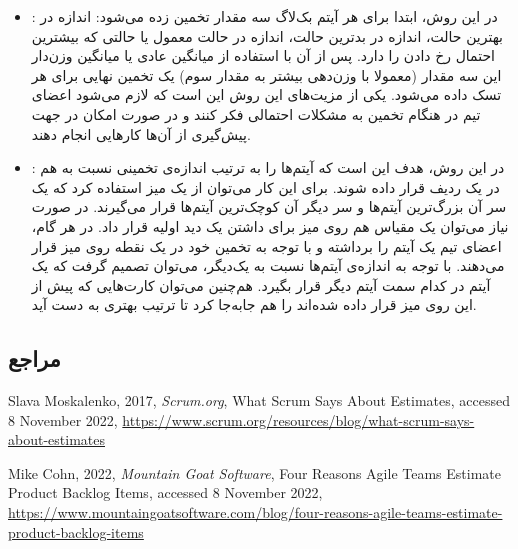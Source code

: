 {\begin{itemize}
\item
{}:
در این روش، ابتدا برای هر آیتم بک‌لاگ سه مقدار تخمین زده می‌شود: اندازه در بهترین‌ حالت، اندازه در بدترین حالت، اندازه در حالت معمول یا حالتی که بیشترین احتمال رخ دادن را دارد. پس از آن با استفاده از میانگین عادی یا میانگین وزن‌دار این سه مقدار (معمولا با وزن‌دهی بیشتر به مقدار سوم) یک تخمین نهایی برای هر تسک داده می‌شود. یکی از مزیت‌های این روش این است که لازم می‌شود اعضای تیم در هنگام تخمین به مشکلات احتمالی فکر کنند و در صورت امکان در جهت پیش‌گیری از آن‌ها کارهایی انجام دهند.

\item
{}:
در این روش، هدف این است که آیتم‌ها را به ترتیب اندازه‌ی تخمینی نسبت به هم در یک ردیف قرار داده شوند. برای این کار می‌توان از یک میز استفاده کرد که یک سر آن بزرگ‌ترین آیتم‌ها‌ و سر دیگر آن کوچک‌ترین آیتم‌ها قرار می‌گیرند. در صورت نیاز می‌توان یک مقیاس هم روی میز برای داشتن یک دید اولیه قرار داد. در هر گام، اعضای تیم یک آیتم را برداشته و با توجه به تخمین خود در یک نقطه روی میز قرار می‌دهند. با توجه به اندازه‌ی آیتم‌ها نسبت به یک‌دیگر، می‌توان تصمیم گرفت که یک آیتم در کدام سمت آیتم دیگر قرار بگیرد. هم‌چنین می‌توان کارت‌هایی که پیش از این روی میز قرار داده شده‌اند را هم جابه‌جا کرد تا ترتیب بهتری به دست آید.


\end{itemize}

\subsection*{مراجع}

\begin{latin}
	\begingroup
	\renewcommand{\section}[2]{}%
	
	\begin{thebibliography}{9}
		
		Slava Moskalenko,
		2017,
		\textit{Scrum.org},
		What Scrum Says About Estimates, 
		accessed 8 November 2022,
		\url{https://www.scrum.org/resources/blog/what-scrum-says-about-estimates}
		
		
		Mike Cohn,
		2022,
		\textit{Mountain Goat Software},
		Four Reasons Agile Teams Estimate Product Backlog Items, 
		accessed 8 November 2022,
		\url{https://www.mountaingoatsoftware.com/blog/four-reasons-agile-teams-estimate-product-backlog-items}
		

\end{thebibliography}
\end{latin}}
